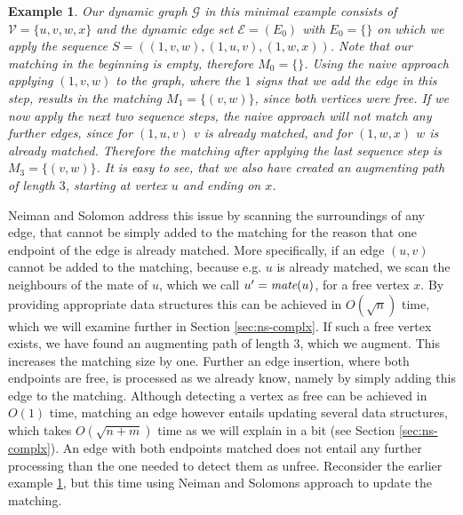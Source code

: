\documentclass{article}      %
\newtheorem{example}{Example}[subsection]
\DeclareMathOperator\mate{\emph{mate}}
\begin{document}
\begin{example}
\label{ex:naive-aug-path}
Our dynamic graph $\mathcal{G}$ in this minimal example consists of $\mathcal{V}=\{u,v,w,x\}$ and the dynamic edge set $\mathcal{E}=( E_0 )$ with $E_0=\{\}$ on which we apply the sequence $S = ((1,v,w),(1,u,v),(1,w,x))$. Note that our matching in the beginning is empty, therefore $M_0=\{\}$. Using the naive approach applying $(1,v,w)$ to the graph, where the $1$ signs that we add the edge in this step, results in the matching $M_1=\{(v,w)\}$, since both vertices were free. If we now apply the next two sequence steps, the naive approach will not match any further edges, since for $(1,u,v)$ $v$ is already matched, and for $(1,w,x)$ $w$ is already matched. Therefore the matching after applying the last sequence step is $M_3=\{(v,w)\}$. It is easy to see, that we also have created an augmenting path of length $3$, starting at vertex $u$ and ending on $x$.
\end{example}

\noindent 
Neiman and Solomon address this issue by scanning the surroundings of any edge, that cannot be simply added to the matching for the reason that one endpoint of the edge is already matched. More specifically, if an edge $(u,v)$ cannot be added to the matching, because e.g. $u$ is already matched, we scan the neighbours of the mate of $u$, which we call $u'=\mate(u)$, for a free vertex $x$. By providing appropriate data structures this can be achieved in $O(\sqrt{n})$ time, which we will examine further in Section \ref{sec:ns-complx}. If such a free vertex exists, we have found an augmenting path of length 3, which we augment. This increases the matching size by one. Further an edge insertion, where both endpoints are free, is processed as we already know, namely by simply adding this edge to the matching. Although detecting a vertex as free can be achieved in $O(1)$ time, matching an edge however entails updating several data structures, which takes $O(\sqrt{n+m})$ time as we will explain in a bit (see Section \ref{sec:ns-complx}). An edge with both endpoints matched does not entail any further processing than the one needed to detect them as unfree. Reconsider the earlier example \ref{ex:naive-aug-path}, but this time using Neiman and Solomons approach to update the matching.
\end{document}
